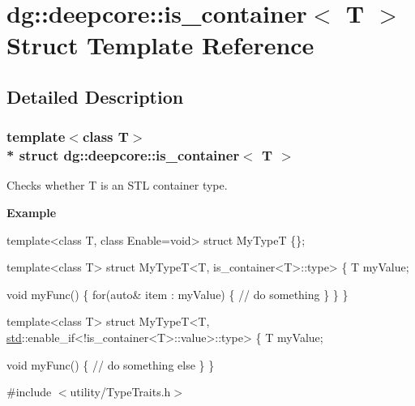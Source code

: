 \hypertarget{structdg_1_1deepcore_1_1is__container}{}\section{dg\+:\+:deepcore\+:\+:is\+\_\+container$<$ T $>$ Struct Template Reference}
\label{structdg_1_1deepcore_1_1is__container}


\subsection{Detailed Description}
\subsubsection*{template$<$class T$>$\\*
struct dg\+::deepcore\+::is\+\_\+container$<$ T $>$}

Checks whether {\ttfamily T} is an S\+TL container type. 

{\bfseries Example} 
\begin{DoxyCode}
\textcolor{keyword}{template}<\textcolor{keyword}{class} T, \textcolor{keyword}{class} Enable=\textcolor{keywordtype}{void}>
\textcolor{keyword}{struct }MyTypeT \{\};

\textcolor{keyword}{template}<\textcolor{keyword}{class} T>
\textcolor{keyword}{struct }MyTypeT<T, is\_container<T>::type>
\{
    T myValue;

    \textcolor{keywordtype}{void} myFunc()
    \{
        \textcolor{keywordflow}{for}(\textcolor{keyword}{auto}& item : myValue) \{
            \textcolor{comment}{// do something}
        \}
    \}
\}

\textcolor{keyword}{template}<\textcolor{keyword}{class} T>
\textcolor{keyword}{struct }MyTypeT<T, \hyperlink{namespacestd}{std}::enable\_if<!is\_container<T>::value>::type>
\{
    T myValue;

    \textcolor{keywordtype}{void} myFunc()
    \{
        \textcolor{comment}{// do something else}
    \}
\}
\end{DoxyCode}
 

{\ttfamily \#include $<$utility/\+Type\+Traits.\+h$>$}

